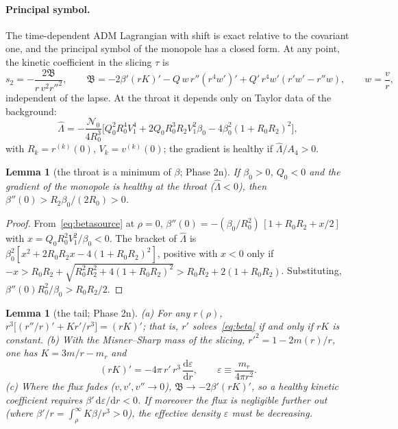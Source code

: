 \documentclass[11pt,a4paper]{article}
\newtheorem{lemma}[theorem]{Lemma}
\theoremstyle{remark}
\newcommand{\Ncal}{\mathcal N}
\newcommand{\dd}{\mathrm d}
\newcommand{\B}{\mathfrak B}
\begin{document}
\paragraph{Principal symbol.} The time-dependent ADM Lagrangian with shift is exact relative to the covariant one, and the principal symbol of the monopole has a closed form. At any point, the kinetic coefficient in the slicing $\tau$ is
\begin{equation}
s_2=-\frac{2\B}{r\,v^2r''^2},\qquad \B=-2\beta'(rK)'-Q\,w\,r''(r^4w')'+Q'\,r^4w'(r'w'-r''w),\qquad w=\frac vr ,
\label{eq:B}
\end{equation}
independent of the lapse. At the throat it depends only on Taylor data of the background:
\begin{equation}
\hat\Lambda=-\frac{\Ncal_0}{4R_0^3}\Big[Q_0^2R_0^4V_1^4+2Q_0R_0^3R_2V_1^2\beta_0-4\beta_0^2(1+R_0R_2)^2\Big],
\end{equation}
with $R_k=r^{(k)}(0)$, $V_k=v^{(k)}(0)$; the gradient is healthy if $\hat\Lambda/A_4>0$.

\begin{lemma}[the throat is a minimum of $\beta$; Phase 2n]\label{lem:minimum}
If $\beta_0>0$, $Q_0<0$ and the gradient of the monopole is healthy at the throat ($\hat\Lambda<0$), then $\beta''(0)>R_2\beta_0/(2R_0)>0$.
\end{lemma}
\begin{proof}
From~\eqref{eq:betasource} at $\rho=0$, $\beta''(0)=-(\beta_0/R_0^2)\,[1+R_0R_2+x/2]$ with $x=Q_0R_0^2V_1^2/\beta_0<0$. The bracket of $\hat\Lambda$ is $\beta_0^2[x^2+2R_0R_2x-4(1+R_0R_2)^2]$, positive with $x<0$ only if $-x>R_0R_2+\sqrt{R_0^2R_2^2+4(1+R_0R_2)^2}>R_0R_2+2(1+R_0R_2)$. Substituting, $\beta''(0)R_0^2/\beta_0>R_0R_2/2$.
\end{proof}

\begin{lemma}[the tail; Phase 2n]\label{lem:tail}
(a) For any $r(\rho)$, $r^3\big[(r''/r)'+Kr'/r^3\big]=(rK)'$; that is, $r'$ solves~\eqref{eq:beta} if and only if $rK$ is constant. (b) With the Misner--Sharp mass of the slicing, $r'^2=1-2m(r)/r$, one has $K=3m/r-m_r$ and
\begin{equation}
(rK)'=-4\pi\,r'\,r^3\,\frac{\dd\varepsilon}{\dd r},\qquad \varepsilon\equiv\frac{m_r}{4\pi r^2}.
\end{equation}
(c) Where the flux fades ($v,v',v''\to0$), $\B\to-2\beta'(rK)'$, so a healthy kinetic coefficient requires $\beta'\,\dd\varepsilon/\dd r<0$. If moreover the flux is negligible further out (where $\beta'/r=\int_\rho^\infty K\beta/r^3>0$), the effective density $\varepsilon$ must be decreasing.
\end{lemma}
\end{document}
